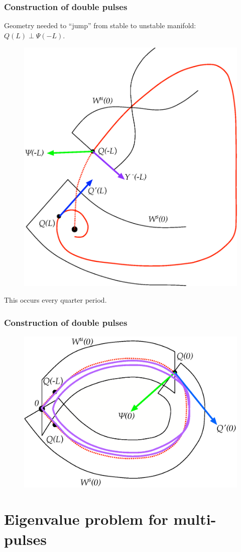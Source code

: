\documentclass[16pt]{beamer}
\begin{document}
\begin{frame}
	\frametitle{Construction of double pulses}
	\fontsize{16}{7.2}\selectfont
	Geometry needed to ``jump'' from stable to unstable manifold: $Q(L) \perp \Psi(-L)$.
	\begin{figure}
	\begin{center}
	\includegraphics[width=0.45\linewidth]{images/manifoldslineup.eps}
	\end{center}
	\end{figure}
	This occurs every quarter period.
\end{frame}

\begin{frame}
	\frametitle{Construction of double pulses}
	\fontsize{16}{7.2}\selectfont
	\begin{figure}
	\begin{center}
	\includegraphics[width=0.6\linewidth]{images/WsWudouble}
	\end{center}
	\end{figure}
\end{frame}

\section{Eigenvalue problem for multi-pulses}
\end{document}
